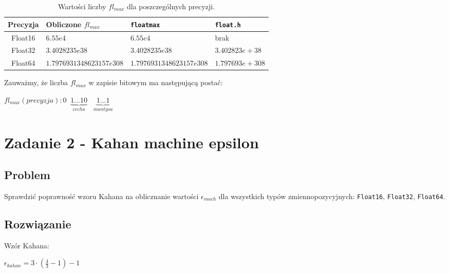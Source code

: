 \documentclass[12pt]{article}
\begin{document}
        \begin{table}[h!]
            \centering
            \begin{tabularx}{0.9\textwidth}{c l l l}
                \hline
                Precyzja & Obliczone $fl_{max}$ & \texttt{floatmax} & \texttt{float.h} \\
                \hline
                Float16 & $6.55e4$ & $6.55e4$ & brak \\
                Float32 & $3.4028235e38$ & $3.4028235e38$ & $3.402823e+38$ \\
                Float64 & $1.7976931348623157e308$ & $1.7976931348623157e308$ & $1.797693e+308$ \\
                \hline
            \end{tabularx}
            \caption{Wartości liczby $fl_{max}$ dla poszczególnych precyzji.}
            \label{table:floatmax}
        \end{table}

        \noindent Zauważmy, że liczba $fl_{max}$ w zapisie bitowym ma następującą postać:
        \begin{center}
        \begin{math}
            fl_{max}(precyzja) : 0 \;\; \underbrace{1...10}_{cecha} \;\;\; \underbrace{1...1}_{mantysa}
        \end{math}
        \end{center}

\newpage

\section*{Zadanie 2 - Kahan machine epsilon}
    \subsection*{Problem}
        Sprawdzić poprawność wzoru Kahana na oblicznanie wartości $\epsilon_{mach}$ dla wszystkich typów zmiennopozycyjnych: \texttt{Float16}, \texttt{Float32}, \texttt{Float64}.

    \subsection*{Rozwiązanie}
        Wzór Kahana:
        \begin{center}
        \begin{math}
            \epsilon_{kahan} = 3 \cdot (\frac{4}{3} - 1) - 1
        \end{math}
        \end{center}
\end{document}

